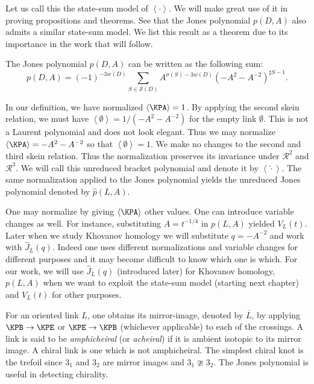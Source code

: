 Let us call this the state-sum model of $\left< \cdot \right>$. We will make great use of it in proving propositions and theorems. See that the Jones polynomial $p(D,A)$ also admits a similar state-sum model. We list this result as a theorem due to its importance in the work that will follow.

\begin{theorem}
\label{cha:jones-polynomial-8}
The Jones polynomial $p(D, A)$ can be written as the following sum: 
\begin{equation}
\label{eq:1}
p(D,A) = (-1)^{-3w(D)} \sum_{S\in \mathcal{S}(D)}^{} A^{\sigma(S) - 3w(D)} (-A^2 - A^{-2})^{\sharp S - 1}.
\end{equation}
\end{theorem}

In our definition, we have normalized $\left< \KPA \right> = 1$. By applying the second skein relation, we must have $\left< \emptyset \right> = 1/(-A^2-A^{-2})$ for the empty link $\emptyset$. This is not a Laurent polynomial and does not look elegant. Thus we may normalize $\left< \KPA \right> = -A^2 - A^{-2}$ so that $\left< \emptyset \right> = 1$. We make no changes to the second and third skein relation. Thus the normalization preserves its invariance under $\mathcal{R}^2$ and $\mathcal{R}^3$. We will call this unreduced bracket polynomial and denote it by $\left< \hat{\cdot} \right>$. The same normalization applied to the Jones polynomial yields the unreduced Jones polynomial denoted by $\hat{p}(L,A)$.

One may normalize by giving $\left< \KPA \right>$ other values. One can introduce variable changes as well. For instance, substituting $A = t^{-1/4}$ in $p(L,A)$ yielded $V_L(t)$. Later when we study Khovanov homology we will substitute $q = -A^{-2}$ and work with $\hat{J}_L(q)$. Indeed one uses different normalizations and variable changes for different purposes and it may become difficult to know which one is which. For our work, we will use $\hat{J}_L(q)$ (introduced later) for Khovanov homology, $p(L,A)$ when we want to exploit the state-sum model (starting next chapter) and $V_L(t)$ for other purposes.

For an oriented link $L$, one obtains its mirror-image, denoted by $\overline{L}$, by applying $\KPB \to \KPE$ or $\KPE \to \KPB$ (whichever applicable) to each of the crossings. A link is said to be \emph{amphicheiral} (or \emph{acheiral}) if it is ambient isotopic to its mirror image. A chiral link is one which is not amphicheiral. The simplest chiral knot is the trefoil since $3_1$ and $3_2$ are mirror images and $3_1 \ncong 3_2$. The Jones polynomial is useful in detecting chirality.

